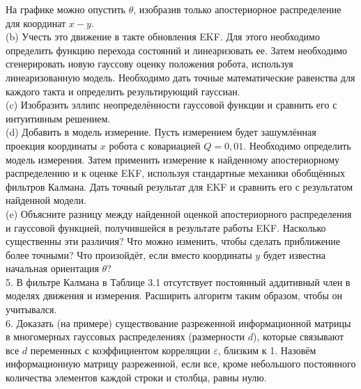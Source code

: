 \documentclass[10pt,a4paper]{article}
\begin{document}
На графике можно опустить $\theta$, изобразив только апостериорное распределение для координат $x-y$.\\

(b) Учесть это движение в такте обновления EKF. Для этого необходимо определить функцию перехода состояний и линеаризовать ее. Затем необходимо сгенерировать новую гауссову оценку положения робота, используя линеаризованную модель. Необходимо дать точные математические равенства для каждого такта и определить результирующий гауссиан.\\
 
(c) Изобразить эллипс неопределённости гауссовой функции и сравнить его с интуитивным решением.\\
 
(d) Добавить в модель измерение. Пусть измерением будет зашумлённая проекция координаты $x$ робота с ковариацией $Q = 0,01$. Необходимо определить модель измерения. Затем применить измерение к найденному апостериорному распределению и к оценке EKF, используя стандартные механики обобщённых фильтров Калмана. Дать точный результат для EKF и сравнить его с результатом найденной модели.\\

(e) Объясните разницу между найденной оценкой апостериорного распределения и гауссовой функцией, получившейся в результате работы EKF. Насколько существенны эти различия? Что можно изменить, чтобы сделать приближение более точными? Что произойдёт, если вместо координаты $y$ будет известна начальная ориентация $\theta$?\\

5. В фильтре Калмана в Таблице 3.1 отсутствует постоянный аддитивный член в моделях движения и измерения. Расширить алгоритм таким образом, чтобы он учитывался.\\

6. Доказать (на примере) существование разреженной информационной матрицы в многомерных гауссовых распределениях (размерности $d$), которые связывают все $d$ переменных с коэффициентом корреляции $\varepsilon$, близким к 1. Назовём информационную матрицу разреженной, если все, кроме небольшого постоянного количества элементов каждой строки и столбца, равны нулю.\\ 
\end{document}

